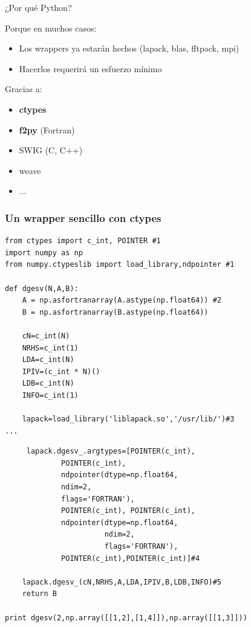 \documentclass{beamer}
\begin{document}
\begin{frame}
 \begin{center}
  \begin{Huge}
   ¿Por qué Python?
  \end{Huge}
\end{center}
\end{frame}

\begin{frame}
 Porque en muchos casos:
\begin{itemize}
 \item Los wrappers ya estarán hechos (lapack, blas, fftpack, mpi)
 \item Hacerlos requerirá un esfuerzo mínimo
\end{itemize}
Gracias a:
\begin{itemize}
 \item \textbf{ctypes}
 \item \textbf{f2py} (Fortran)
 \item SWIG (C, C++)
 \item weave
 \item ...
\end{itemize}


\end{frame}


\begin{frame}[containsverbatim]
 \frametitle{Un wrapper sencillo con ctypes}
\begin{verbatim}
from ctypes import c_int, POINTER #1
import numpy as np
from numpy.ctypeslib import load_library,ndpointer #1

def dgesv(N,A,B):
    A = np.asfortranarray(A.astype(np.float64)) #2
    B = np.asfortranarray(B.astype(np.float64))

    cN=c_int(N)
    NRHS=c_int(1)
    LDA=c_int(N)
    IPIV=(c_int * N)()
    LDB=c_int(N)
    INFO=c_int(1)

    lapack=load_library('liblapack.so','/usr/lib/')#3
...
\end{verbatim}
\end{frame}

\begin{frame}[containsverbatim]
 \begin{verbatim}
     lapack.dgesv_.argtypes=[POINTER(c_int),
             POINTER(c_int),
             ndpointer(dtype=np.float64,
             ndim=2,
             flags='FORTRAN'),
             POINTER(c_int), POINTER(c_int),
             ndpointer(dtype=np.float64,
                       ndim=2,
                       flags='FORTRAN'),
             POINTER(c_int),POINTER(c_int)]#4

    lapack.dgesv_(cN,NRHS,A,LDA,IPIV,B,LDB,INFO)#5
    return B

print dgesv(2,np.array([[1,2],[1,4]]),np.array([[1,3]]))
\end{verbatim}
\end{frame}
\end{document}

